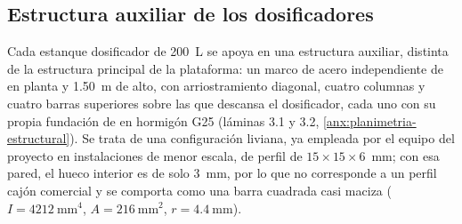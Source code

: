 
\subsection{Estructura auxiliar de los dosificadores}
\label{sec:res-auxiliar}

Cada estanque dosificador de \qty{200}{\liter} se apoya en una estructura auxiliar, distinta de la estructura principal de la plataforma: un marco de acero independiente de  en planta y \qty{1.50}{\meter} de alto, con arriostramiento diagonal, cuatro columnas y cuatro barras superiores sobre las que descansa el dosificador, cada uno con su propia fundación de  en hormigón G25 (láminas 3.1 y 3.2, \cref{anx:planimetria-estructural}).
Se trata de una configuración liviana, ya empleada por el equipo del proyecto en instalaciones de menor escala, de perfil de $15 \times 15 \times 6$~\unit{\milli\meter}; con esa pared, el hueco interior es de solo \qty{3}{\milli\meter}, por lo que no corresponde a un perfil cajón comercial y se comporta como una barra cuadrada casi maciza ($I = \qty{4212}{\milli\meter\tothe{4}}$, $A = \qty{216}{\milli\meter\squared}$, $r = \qty{4.4}{\milli\meter}$).


